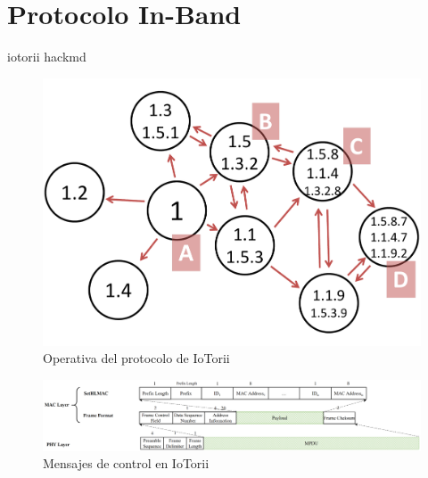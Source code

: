 \section{Protocolo In-Band}
\label{sec:ana_inband}

iotorii hackmd




\begin{figure}[ht!]
    \centering
    \includegraphics[width=\textwidth]{archivos/img/analisis/iotorii-operation.pdf}
    \caption{Operativa del protocolo de IoTorii \cite{rojas2021outperforming}}
    \label{fig:iotorii-operation}
\end{figure}



\begin{figure}[ht!]
    \centering
    \includegraphics[width=\textwidth]{archivos/img/analisis/Comparation_frame_iotorii.eps}
    \caption{Mensajes de control en IoTorii \cite{rojas2021outperforming}}
    \label{fig:frameformat-setHLMAC}
\end{figure}